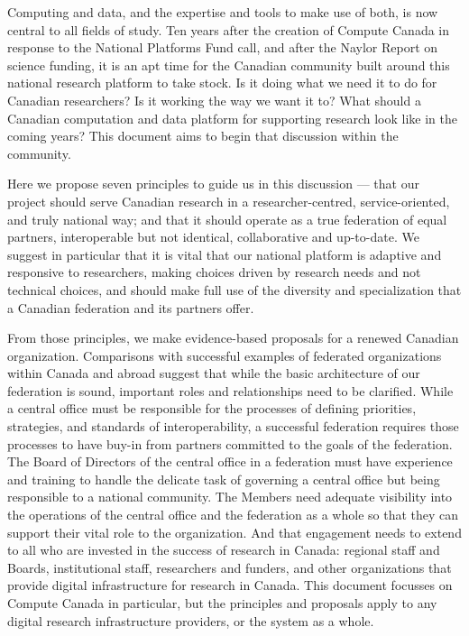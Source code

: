 \documentclass[11pt, letterpaper, twoside]{article}
\title{\Title}
\author{\Author}
\date{\Date}
\begin{document}

\begin{titlepage} \maketitle \end{titlepage}

\cleardoublepage


\thispagestyle{empty} 

\begin{executive}

Computing and data, and the expertise and tools to make use of both, is
now central to all fields of study. Ten years after the creation of
Compute Canada in response to the National Platforms Fund call, and
after the Naylor Report on science funding, it is an apt time for the
Canadian community built around this national research platform to take
stock. Is it doing what we need it to do for Canadian researchers? Is it
working the way we want it to? What should a Canadian computation and
data platform for supporting research look like in the coming years?
This document aims to begin that discussion within the community.

Here we propose seven principles to guide us in this discussion --- that
our project should serve Canadian research in a researcher-centred,
service-oriented, and truly national way; and that it should operate as
a true federation of equal partners, interoperable but not identical,
collaborative and up-to-date. We suggest in particular that it is vital
that our national platform is adaptive and responsive to researchers,
making choices driven by research needs and not technical choices, and
should make full use of the diversity and specialization that a Canadian
federation and its partners offer.

From those principles, we make evidence-based proposals for a renewed
Canadian organization. Comparisons with successful examples of federated
organizations within Canada and abroad suggest that while the basic
architecture of our federation is sound, important roles and
relationships need to be clarified. While a central office must be
responsible for the processes of defining priorities, strategies, and
standards of interoperability, a successful federation requires those
processes to have buy-in from partners committed to the goals of the
federation. The Board of Directors of the central office in a federation
must have experience and training to handle the delicate task of
governing a central office but being responsible to a national
community. The Members need adequate visibility into the operations of
the central office and the federation as a whole so that they can
support their vital role to the organization. And that engagement needs
to extend to all who are invested in the success of research in Canada:
regional staff and Boards, institutional staff, researchers and funders,
and other organizations that provide digital infrastructure for research
in Canada. This document focusses on Compute Canada in particular, but
the principles and proposals apply to any digital research
infrastructure providers, or the system as a whole.


\end{executive}
\end{document}
